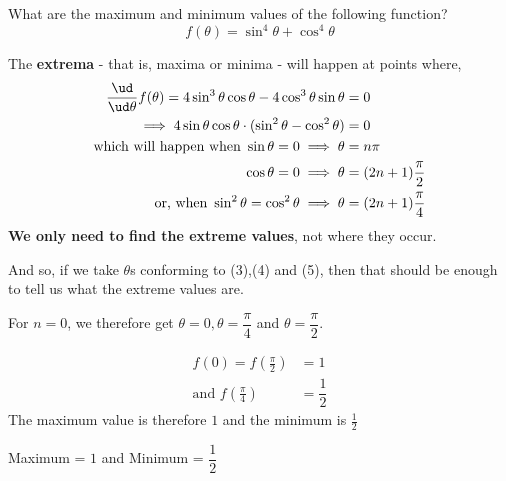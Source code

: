 
\question[3] What are the maximum and minimum values of the following function?
  \[ f(\theta) = \sin^4\theta + \cos^4\theta \]


\ifprintanswers
\fi 

\begin{solution}[\fullpage]
  The \textbf{extrema} - that is, maxima or minima - will happen at points where,
  \begin{align}
     \dfrac{\ud}{\ud\theta}f(\theta) = 4\sin^3\theta\cos\theta - 4\cos^3\theta\sin\theta &= 0\\
        \implies 4\sin\theta\cos\theta\cdot(\sin^2\theta - \cos^2\theta) &= 0 \\
        \text{which will happen when } \sin\theta = 0 \implies \theta &= n\pi \\
              \cos\theta = 0 \implies \theta &= (2n+1)\frac{\pi}{2} \\
        \text{or, when } \sin^2\theta = \cos^2\theta \implies \theta &= (2n+1)\frac{\pi}{4}
  \end{align}
  \textbf{We only need to find the extreme values}, not where they occur.
  
  And so, if we take $\theta$s conforming to (3),(4) and (5), then
  that should be enough to tell us what the extreme values are. 
  
  For $n=0$, we therefore get $\theta=0, \theta=\dfrac\pi{4}$ and $\theta=\dfrac\pi{2}$.
  
  \begin{align}
     f(0) = f(\frac{\pi}{2}) &= 1 \\
     \text{and } f(\frac{\pi}{4}) &= \dfrac{1}{2}
  \end{align}
  The maximum value is therefore $1$ and the minimum is $\frac{1}{2}$
\end{solution}
\ifprintanswers\begin{codex}Maximum = $1$ and Minimum = $\dfrac{1}{2}$\end{codex}\fi

